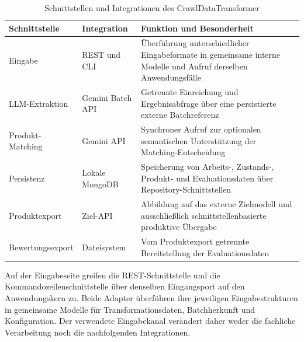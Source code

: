 \begin{table}[H]
    \centering
    \footnotesize
    \renewcommand{\arraystretch}{1.15}
    \begin{tabular}{
        |p{}
        |p{}
        |p{}|
    }
        \hline
        \textbf{Schnittstelle} &
        \textbf{Integration} &
        \textbf{Funktion und Besonderheit} \\
        \hline

        Eingabe &
        REST und CLI &
        Überführung unterschiedlicher Eingabeformate in gemeinsame interne Modelle und Aufruf derselben Anwendungsfälle \\
        \hline

        LLM-Extraktion &
        Gemini Batch API &
        Getrennte Einreichung und Ergebnisabfrage über eine persistierte externe Batchreferenz \\
        \hline

        Produkt-Matching &
        Gemini API &
        Synchroner Aufruf zur optionalen semantischen Unterstützung der Matching-Entscheidung \\
        \hline

        Persistenz &
        Lokale MongoDB &
        Speicherung von Arbeits-, Zustands-, Produkt- und Evaluationsdaten über Repository-Schnittstellen \\
        \hline

        Produktexport &
        Ziel-API &
        Abbildung auf das externe Zielmodell und ausschließlich schnittstellenbasierte produktive Übergabe \\
        \hline

        Bewertungsexport &
        Dateisystem &
        Vom Produktexport getrennte Bereitstellung der Evaluationsdaten \\
        \hline
    \end{tabular}
    \caption{Schnittstellen und Integrationen des CrawlDataTransformer}
    \label{tab:interface-overview}
\end{table}

Auf der Eingabeseite greifen die REST-Schnittstelle und die Kommandozeilenschnittstelle über denselben Eingangsport auf den Anwendungskern zu. Beide Adapter überführen ihre 
jeweiligen Eingabestrukturen in gemeinsame Modelle für Transformationsdaten, Batchherkunft und Konfiguration. Der verwendete Eingabekanal verändert daher weder die 
fachliche Verarbeitung noch die nachfolgenden Integrationen.

